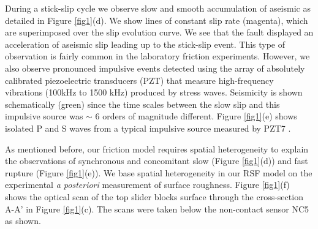 \documentclass[preprint,1p, 10pt,authoryear]{elsarticle}
\begin{document}
During a stick-slip cycle we observe slow and smooth accumulation of aseismic as detailed in Figure \ref{fig1}(d). We show lines of constant slip rate (magenta), which are superimposed over the slip evolution curve.  We see that the fault displayed an acceleration of aseismic slip leading up to the stick-slip event. This type of observation is fairly common in the laboratory friction experiments. However, we also observe pronounced impulsive events detected using the array of absolutely calibrated piezoelectric transducers (PZT) that measure high-frequency vibrations (100kHz to 1500 kHz) produced by stress waves. Seismicity is shown schematically (green) since the time scales between the slow slip and this impulsive source was $\sim$ 6 orders of magnitude different.  Figure \ref{fig1}(e) shows isolated P and S waves from a typical impulsive source measured by PZT7  \citep{Selvadurai2019}.
 
As mentioned before, our friction model requires spatial heterogeneity to explain the observations of synchronous and concomitant slow (Figure \ref{fig1}(d)) and fast rupture (Figure \ref{fig1}(e)). We base spatial heterogeneity in our RSF model on the experimental \textit{a posteriori} measurement of surface roughness. Figure \ref{fig1}(f) shows the optical scan of the top slider blocks surface through the cross-section A-A' in Figure \ref{fig1}(c).  The scans were taken below the non-contact sensor NC5 as shown.
\end{document}
